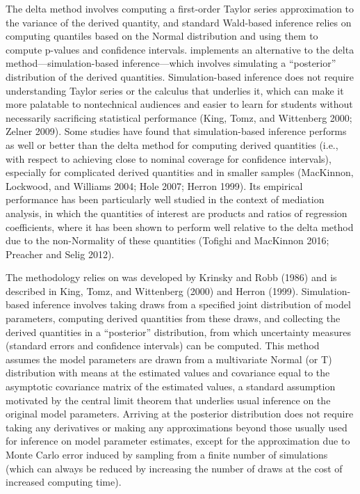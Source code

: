The delta method involves computing a first-order Taylor series approximation to the variance of the derived quantity, and standard Wald-based inference relies on computing quantiles based on the Normal distribution and using them to compute p-values and confidence intervals.  implements an alternative to the delta method---simulation-based inference---which involves simulating a ``posterior'' distribution of the derived quantities. Simulation-based inference does not require understanding Taylor series or the calculus that underlies it, which can make it more palatable to nontechnical audiences and easier to learn for students without necessarily sacrificing statistical performance (King, Tomz, and Wittenberg 2000; Zelner 2009). Some studies have found that simulation-based inference performs as well or better than the delta method for computing derived quantities (i.e., with respect to achieving close to nominal coverage for confidence intervals), especially for complicated derived quantities and in smaller samples (MacKinnon, Lockwood, and Williams 2004; Hole 2007; Herron 1999). Its empirical performance has been particularly well studied in the context of mediation analysis, in which the quantities of interest are products and ratios of regression coefficients, where it has been shown to perform well relative to the delta method due to the non-Normality of these quantities (Tofighi and MacKinnon 2016; Preacher and Selig 2012).

The methodology  relies on was developed by Krinsky and Robb (1986) and is described in King, Tomz, and Wittenberg (2000) and Herron (1999). Simulation-based inference involves taking draws from a specified joint distribution of model parameters, computing derived quantities from these draws, and collecting the derived quantities in a ``posterior'' distribution, from which uncertainty measures (standard errors and confidence intervals) can be computed. This method assumes the model parameters are drawn from a multivariate Normal (or T) distribution with means at the estimated values and covariance equal to the asymptotic covariance matrix of the estimated values, a standard assumption motivated by the central limit theorem that underlies usual inference on the original model parameters. Arriving at the posterior distribution does not require taking any derivatives or making any approximations beyond those usually used for inference on model parameter estimates, except for the approximation due to Monte Carlo error induced by sampling from a finite number of simulations (which can always be reduced by increasing the number of draws at the cost of increased computing time).

